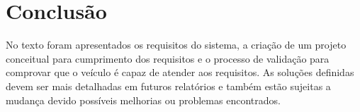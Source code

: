 \section{Conclusão}
\label{sec:conclusao}

No texto foram apresentados os requisitos do sistema, a criação de um projeto conceitual para cumprimento dos requisitos e o processo de validação para comprovar que o veículo é capaz de atender aos requisitos. As soluções definidas devem ser mais detalhadas em futuros relatórios e também estão sujeitas a mudança devido possíveis melhorias ou problemas encontrados. 
